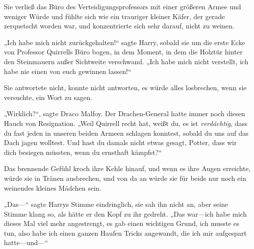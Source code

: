 \later

Sie verließ das Büro des Verteidigungsprofessors mit einer größeren Armee und weniger Würde und fühlte sich wie ein trauriger kleiner Käfer, der gerade zerquetscht worden war, und konzentrierte sich sehr darauf, nicht zu weinen.

„Ich habe mich nicht zurückgehalten!“ sagte Harry, sobald sie um die erste Ecke von Professor Quirrells Büro bogen, in dem Moment, in dem die Holztür hinter den Steinmauern außer Sichtweite verschwand. „Ich habe mich nicht verstellt, ich habe nie einen von euch gewinnen lassen!“

Sie antwortete nicht, konnte nicht antworten, es würde alles losbrechen, wenn sie versuchte, ein Wort zu sagen.

„Wirklich?“, sagte Draco Malfoy. Der Drachen-General hatte immer noch diesen Hauch von Resignation. „Weil Quirrell recht hat, weißt du, es ist \emph{verdächtig}, dass du fast jeden in unseren beiden Armeen schlagen konntest, sobald du uns auf das Dach jagen wolltest. Und hast du damals nicht etwas gesagt, Potter, dass wir dich besiegen müssten, wenn du ernsthaft kämpfst?“

Das brennende Gefühl kroch ihre Kehle hinauf, und wenn es ihre Augen erreichte, würde sie in Tränen ausbrechen, und von da an würde sie für beide nur noch ein weinendes kleines Mädchen sein.

„Das—“ sagte Harrys Stimme eindringlich, sie sah ihn nicht an, aber seine Stimme klang so, als hätte er den Kopf zu ihr gedreht. „Das war—ich habe mich dieses Mal viel mehr angestrengt, es gab einen wichtigen Grund, ich musste es tun, also habe ich einen ganzen Haufen Tricks angewandt, die ich mir aufgespart hatte—und—“

